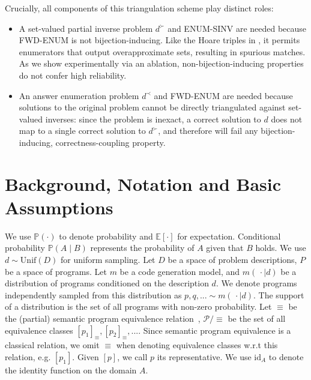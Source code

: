 \documentclass[acmsmall,screen,nonacm]{acmart}
\begin{document}
Crucially, all components of this triangulation scheme play distinct roles:

\begin{itemize}
\item A set-valued partial inverse problem $d^{\succ}$ and ENUM-SINV are needed because FWD-ENUM is not bijection-inducing. Like the Hoare triples in , it permits enumerators that output overapproximate sets, resulting in spurious matches. As we show experimentally via an ablation, non-bijection-inducing properties do not confer high reliability.
\item An answer enumeration problem $d^{\prec}$ and FWD-ENUM are needed because solutions to the original problem cannot be directly triangulated against set-valued inverses: since the problem is inexact, a correct solution to $d$ does not map to a single correct solution to $d^{\succ}$, and therefore will fail any bijection-inducing, correctness-coupling property.
\end{itemize}

\section{Background, Notation and Basic Assumptions}
\label{sec:background}

We use $\mathds{P}(\cdot)$ to denote probability and $\mathds{E}[\cdot]$ for expectation. Conditional probability $\mathds{P}(A\mid B)$ represents the probability of $A$ given that $B$ holds. We use $d \sim \mathrm{Unif}(D)$ for uniform sampling. Let $D$ be a space of problem descriptions, $P$ be a space of programs. Let $m$ be a code generation model, and $m(\,\cdot\mid d)$ be a distribution of programs conditioned on the description $d$. We denote programs independently sampled from this distribution as $p, q,...\sim m(\,\cdot\mid d)$. The support of a distribution is the set of all programs with non-zero probability. Let $\equiv$ be the (partial) semantic program equivalence relation~\cite{ciobacua2016language}, $\mathcal{P}/{\equiv}$ be the set of all equivalence classes $[p_1]_{\equiv}, [p_2]_{\equiv}, ...$. Since semantic program equivalence is a classical relation, we omit $\equiv$ when denoting equivalence classes w.r.t this relation, e.g. $[p_1]$. Given $[p]$, we call $p$ its representative. We use $\mathrm{id}_A$ to denote the identity function on the domain $A$.
\end{document}
